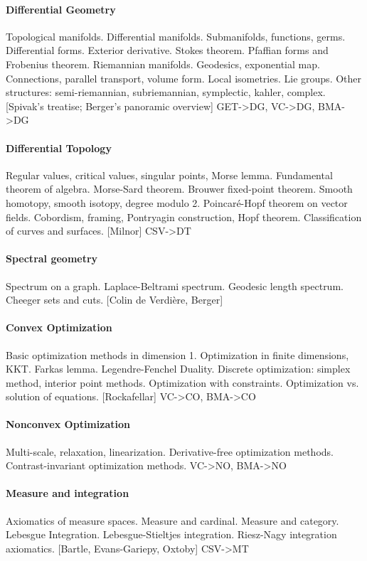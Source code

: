 \paragraph{Differential Geometry}
Topological manifolds.
Differential manifolds.
Submanifolds, functions, germs.
Differential forms.
Exterior derivative.
Stokes theorem.
Pfaffian forms and Frobenius theorem.
Riemannian manifolds.  Geodesics, exponential map.
Connections, parallel transport, volume form.
Local isometries.  Lie groups.
Other structures: semi-riemannian, subriemannian, symplectic, kahler, complex.
[Spivak's treatise; Berger's panoramic overview]
{GET->DG, VC->DG, BMA->DG}

\paragraph{Differential Topology}
Regular values, critical values, singular points, Morse lemma.
Fundamental theorem of algebra.
Morse-Sard theorem.
Brouwer fixed-point theorem.
Smooth homotopy, smooth isotopy, degree modulo 2.
Poincaré-Hopf theorem on vector fields.
Cobordism, framing, Pontryagin construction, Hopf theorem.
Classification of curves and surfaces.
[Milnor]
{CSV->DT}

\paragraph{Spectral geometry}
Spectrum on a graph.
Laplace-Beltrami spectrum.
Geodesic length spectrum.
Cheeger sets and cuts.
[Colin de Verdière, Berger]


\paragraph{Convex Optimization}
Basic optimization methods in dimension 1.
Optimization in finite dimensions, KKT.
Farkas lemma.
Legendre-Fenchel Duality.
Discrete optimization: simplex method, interior point methods.
Optimization with constraints.
Optimization vs. solution of equations.
[Rockafellar]
{VC->CO, BMA->CO}

\paragraph{Nonconvex Optimization}
Multi-scale, relaxation, linearization.
Derivative-free optimization methods.
Contrast-invariant optimization methods.
{VC->NO, BMA->NO}

\paragraph{Measure and integration}
Axiomatics of measure spaces.
Measure and cardinal.
Measure and category.
Lebesgue Integration.
Lebesgue-Stieltjes integration.
Riesz-Nagy integration axiomatics.
[Bartle, Evans-Gariepy, Oxtoby]
{CSV->MT}

